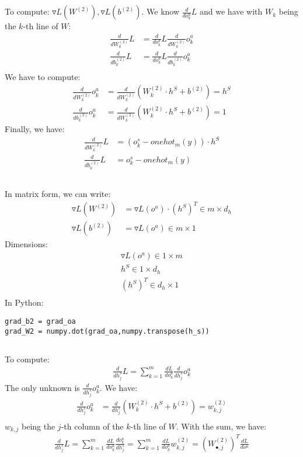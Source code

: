 \documentclass[12pt]{article}
\begin{document}
\subsection{}
To compute: $\triangledown L(W^{(2)}), \triangledown L(b^{(2)})$.
We know $\frac{d}{do^a_k} L$ and we have with $W_k$ being the $k$-th line of $W$:
\begin{align*}
\frac{d}{dW^{(2)}_{k}} L &= \frac{d}{do^a_k} L \frac{d}{dW^{(2)}_{k}} o^a_k \\
\frac{d}{db^{(2)}_{k}} L &= \frac{d}{do^a_k} L \frac{d}{db^{(2)}_{k}} o^a_k \\
\end{align*}
We have to compute:
\begin{align*}
\frac{d}{dW^{(2)}_{k}} o^a_k & = \frac{d}{dW^{(2)}_{k}} (W^{(2)}_{k} \cdot h^S + b^{(2)}) = h^S \\
\frac{d}{db^{(2)}_{k}} o^a_k &= \frac{d}{dW^{(2)}_{k}} (W^{(2)}_{k} \cdot h^S + b^{(2)}) = 1
\end{align*}
Finally, we have:
\begin{align*}
\frac{d}{dW^{(2)}_{k}} L & = (o^s_k-onehot_m(y)) \cdot h^S \\
\frac{d}{db^{(2)}_{k}} L & = o^s_k-onehot_m(y)
\end{align*}
\subsection{}
In matrix form, we can write:
\begin{align*}
\triangledown L(W^{(2)}) & = \triangledown L(o^a) \cdot (h^S)^T \in m \times d_h \\
\triangledown L(b^{(2)}) & = \triangledown L(o^a) \in m \times 1
\end{align*}
Dimensions: \begin{align*}
\triangledown L(o^a) \in 1 \times m \\
h^S \in 1 \times d_h \\
(h^S)^T \in d_h \times 1 \\
\end{align*}
In Python:
\begin{lstlisting}
grad_b2 = grad_oa
grad_W2 = numpy.dot(grad_oa,numpy.transpose(h_s))
\end{lstlisting}
\subsection{}
To compute: 
\begin{align*}
\frac{d}{dh^s_j}L = \sum\limits_{k=1}^m \frac{dL}{do_k^a} \frac{d}{dh_j^s}o_k^a
\end{align*}
The only unknown is $\frac{d}{dh_j^s}o_k^a$. We have:
\begin{align*}
\frac{d}{dh^s_j} {o^a_k} &= \frac{d}{dh^s_j} (W^{(2)}_{k} \cdot h^S + b^{(2)}) = w^{(2)}_{k,j} \\
\end{align*}
$w_{k,j}$ being the $j$-th column of the $k$-th line of $W$. With the sum, we have:
\begin{align*}
\frac{d}{dh^s_j}L = \sum\limits_{k=1}^m \frac{dL}{do^a_k} \frac{d{o^a_k}}{dh^s_j} = 
\sum\limits_{k=1}^m \frac{dL}{do^a_k}  w^{(2)}_{k,j}=(W^{(2)}_{\bullet,j})^T \frac{dL}{do^a} 
\end{align*}
\end{document}
